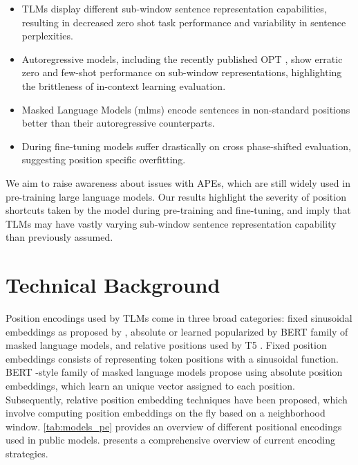 \documentclass[letterpaper, 12pt]{report}
\begin{document}
\begin{itemize}
    \item TLMs display different sub-window sentence representation capabilities, resulting in decreased zero shot task performance and variability in sentence perplexities.
    \item Autoregressive models, including the recently published OPT \cite{Zhang2022:OPT}, show erratic zero and few-shot performance on sub-window representations, highlighting the brittleness of in-context learning evaluation.
    \item Masked Language Models (\acrshort{mlm}s) encode sentences in non-standard positions better than their autoregressive counterparts.
    \item During fine-tuning models suffer drastically on cross phase-shifted evaluation, suggesting position specific overfitting.
\end{itemize}

\noindent We aim to raise awareness about issues with APEs, which are still widely used in pre-training large language models.
Our results highlight the severity of position shortcuts taken by the model during pre-training and fine-tuning, and imply that TLMs may have vastly varying sub-window sentence representation capability than previously assumed.
%

\section{Technical Background}
\label{sec:pos_technical_bg}

Position encodings used by TLMs come in three broad categories: fixed sinusoidal embeddings as proposed by \citet{vaswani2017}, absolute or learned popularized by BERT \cite{Devlin2019:BERT} family of masked language models, and relative positions \citep{shaw-etal-2018-self} used by T5 \cite{Raffel2020:T5}.
Fixed position embeddings \cite{vaswani2017} consists of representing token positions with a sinusoidal function. BERT \citep{Devlin2019:BERT}-style family of masked language models propose using absolute position embeddings, which learn an unique vector assigned to each position.
Subsequently, relative position embedding techniques have been proposed, which involve computing position embeddings on the fly based on a neighborhood window. \autoref{tab:models_pe} provides an overview of different positional encodings used in public models.
\citet{wang2021on} presents a comprehensive overview of current encoding strategies.
\end{document}
